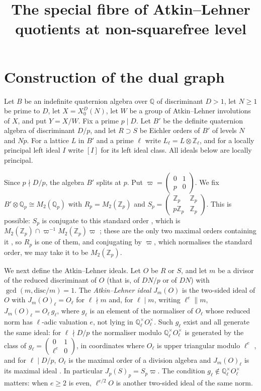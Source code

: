 \documentclass[11pt]{amsart}
\title{The special fibre of Atkin--Lehner quotients at non-squarefree level}
\theoremstyle{plain}
\theoremstyle{remark}
\newcommand{\Q}{\mathbb{Q}}
\newcommand{\Z}{\mathbb{Z}}
\newcommand{\Qp}{\mathbb{Q}_p}
\begin{document}
\maketitle

\section{Construction of the dual graph}

Let $B$ be an indefinite quaternion algebra over $\Q$ of discriminant $D > 1$, let $N \ge 1$ be prime to $D$, let $X = X_0^D(N)$, let $W$ be a group of Atkin--Lehner involutions of $X$, and put $Y = X/W$. Fix a prime $p \mid D$. Let $B'$ be the definite quaternion algebra of discriminant $D/p$, and let $R \supset S$ be Eichler orders of $B'$ of levels $N$ and $Np$. For a lattice $L$ in $B'$ and a prime $\ell$ write $L_\ell = L \otimes \Z_\ell$, and for a locally principal left ideal $I$ write $[I]$ for its left ideal class. All ideals below are locally principal.

Since $p \nmid D/p$, the algebra $B'$ splits at $p$. Put $\varpi = \left(\begin{smallmatrix} 0 & 1 \\ p & 0 \end{smallmatrix}\right)$. We fix $B' \otimes \Qp \cong M_2(\Qp)$ with $R_p = M_2(\Z_p)$ and $S_p = \left(\begin{smallmatrix} \Z_p & \Z_p \\ p\Z_p & \Z_p \end{smallmatrix}\right)$. This is possible: $S_p$ is conjugate to this standard order \cite[Proposition~23.4.3(ii)]{Voi}, which is $M_2(\Z_p) \cap \varpi^{-1}M_2(\Z_p)\varpi$ \cite[(23.1.4)]{Voi}; these are the only two maximal orders containing it \cite[23.5.16]{Voi}, so $R_p$ is one of them, and conjugating by $\varpi$, which normalises the standard order, we may take it to be $M_2(\Z_p)$.

We next define the Atkin--Lehner ideals. Let $O$ be $R$ or $S$, and let $m$ be a divisor of the reduced discriminant of $O$ (that is, of $DN/p$ or of $DN$) with $\gcd(m, \text{disc}/m) = 1$. The \emph{Atkin--Lehner ideal} $J_m(O)$ is the two-sided ideal of $O$ with $J_m(O)_\ell = O_\ell$ for $\ell \nmid m$ and, for $\ell \mid m$, writing $\ell^e \parallel m$, $J_m(O)_\ell = O_\ell\, g_\ell$, where $g_\ell$ is an element of the normaliser of $O_\ell$ whose reduced norm has $\ell$-adic valuation $e$, not lying in $\Q_\ell^\times O_\ell^\times$. Such $g_\ell$ exist and all generate the same ideal: for $\ell \nmid D/p$ the normaliser modulo $\Q_\ell^\times O_\ell^\times$ is generated by the class of $g_\ell = \left(\begin{smallmatrix} 0 & 1 \\ \ell^e & 0 \end{smallmatrix}\right)$, in coordinates where $O_\ell$ is upper triangular modulo $\ell^e$ \cite[Proposition~23.4.14]{Voi}, and for $\ell \mid D/p$, $O_\ell$ is the maximal order of a division algebra and $J_m(O)_\ell$ is its maximal ideal \cite[13.3.10, Theorem~13.3.11]{Voi}. In particular $J_p(S)_p = S_p\varpi$. The condition $g_\ell \notin \Q_\ell^\times O_\ell^\times$ matters: when $e \ge 2$ is even, $\ell^{e/2}O$ is another two-sided ideal of the same norm.
\end{document}
